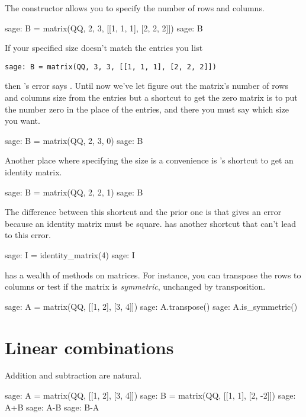 The  constructor allows you to specify the number of
rows and columns.
\begin{sagecommandline}
sage: B = matrix(QQ, 2, 3, [[1, 1, 1], [2, 2, 2]])  
sage: B
\end{sagecommandline}
\noindent
If your specified size doesn't match the entries you list 
\begin{lstlisting}[style=python]
sage: B = matrix(QQ, 3, 3, [[1, 1, 1], [2, 2, 2]])  
\end{lstlisting}
\noindent
then \Sage's error says
.
Until now we've let \Sage{} figure out the matrix's 
number of rows and columns size from the entries but
a shortcut to get the zero matrix 
is to put the number zero in the place of the entries, and there you
must say which size you want.
\begin{sagecommandline}
sage: B = matrix(QQ, 2, 3, 0)                     
sage: B
\end{sagecommandline}
\noindent
Another place where specifying the size is a convenience is 
\Sage's shortcut to get an identity matrix.
\begin{sagecommandline}
sage: B = matrix(QQ, 2, 2, 1)
sage: B
\end{sagecommandline}
\noindent
The difference between this shortcut and the prior one is that 
 gives an error because 
an identity matrix must be square.
\Sage{} has another shortcut that can't lead to this error.
\begin{sagecommandline}
sage: I = identity_matrix(4)
sage: I
\end{sagecommandline}

\Sage{} has a wealth of methods on matrices.
For instance, you can transpose the rows to columns or test if the 
matrix is \textit{symmetric},
unchanged by transposition.
\begin{sagecommandline}
sage: A = matrix(QQ, [[1, 2], [3, 4]])
sage: A.transpose()
sage: A.is_symmetric()
\end{sagecommandline}




\section{Linear combinations}
Addition and subtraction are natural.
\begin{sagecommandline}
sage: A = matrix(QQ, [[1, 2], [3, 4]])
sage: B = matrix(QQ, [[1, 1], [2, -2]])
sage: A+B
sage: A-B
sage: B-A
\end{sagecommandline}


